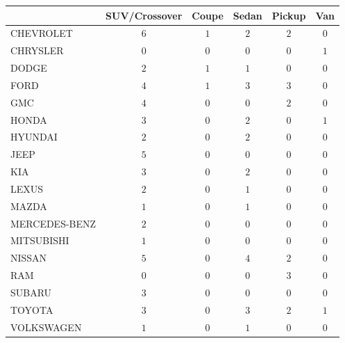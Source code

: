 \begin{tabular}{lccccc}
\toprule
 & SUV/Crossover & Coupe & Sedan & Pickup & Van \\
\midrule
CHEVROLET & $6$ & $1$ & $2$ & $2$ & $0$ \\
CHRYSLER & $0$ & $0$ & $0$ & $0$ & $1$ \\
DODGE & $2$ & $1$ & $1$ & $0$ & $0$ \\
FORD & $4$ & $1$ & $3$ & $3$ & $0$ \\
GMC & $4$ & $0$ & $0$ & $2$ & $0$ \\
HONDA & $3$ & $0$ & $2$ & $0$ & $1$ \\
HYUNDAI & $2$ & $0$ & $2$ & $0$ & $0$ \\
JEEP & $5$ & $0$ & $0$ & $0$ & $0$ \\
KIA & $3$ & $0$ & $2$ & $0$ & $0$ \\
LEXUS & $2$ & $0$ & $1$ & $0$ & $0$ \\
MAZDA & $1$ & $0$ & $1$ & $0$ & $0$ \\
MERCEDES-BENZ & $2$ & $0$ & $0$ & $0$ & $0$ \\
MITSUBISHI & $1$ & $0$ & $0$ & $0$ & $0$ \\
NISSAN & $5$ & $0$ & $4$ & $2$ & $0$ \\
RAM & $0$ & $0$ & $0$ & $3$ & $0$ \\
SUBARU & $3$ & $0$ & $0$ & $0$ & $0$ \\
TOYOTA & $3$ & $0$ & $3$ & $2$ & $1$ \\
VOLKSWAGEN & $1$ & $0$ & $1$ & $0$ & $0$ \\
\bottomrule
\end{tabular}
